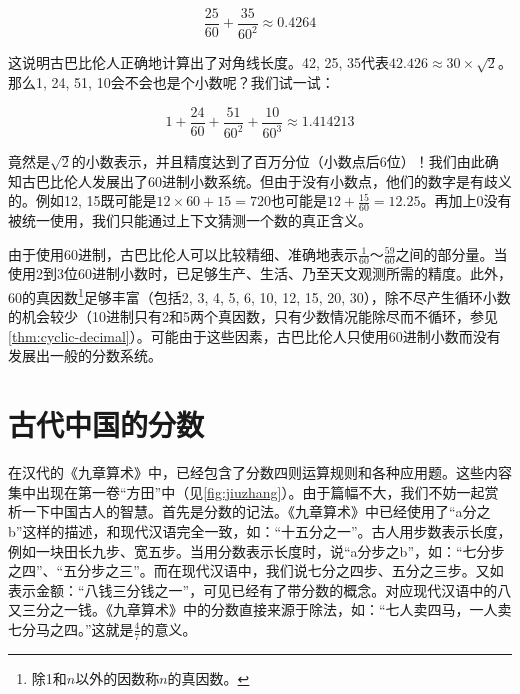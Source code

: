 \documentclass[b5paper]{ctexart}
\begin{document}
\[
\frac{25}{60} + \frac{35}{60^2} \approx 0.4264
\]

这说明古巴比伦人正确地计算出了对角线长度。42, 25, 35代表$42.426 \approx 30 \times \sqrt{2}$。那么1, 24, 51, 10会不会也是个小数呢？我们试一试：

\[
1 + \frac{24}{60} + \frac{51}{60^2} + \frac{10}{60^3} \approx 1.414213
\]

竟然是$\sqrt{2}$的小数表示，并且精度达到了百万分位（小数点后6位）！我们由此确知古巴比伦人发展出了60进制小数系统。但由于没有小数点，他们的数字是有歧义的。例如12, 15既可能是$12 \times 60 + 15 = 720$也可能是$12 + \frac{15}{60} = 12.25$。再加上0没有被统一使用，我们只能通过上下文猜测一个数的真正含义。

由于使用60进制，古巴比伦人可以比较精细、准确地表示$\frac{1}{60}$～$\frac{59}{60}$之间的部分量。当使用2到3位60进制小数时，已足够生产、生活、乃至天文观测所需的精度。此外，60的真因数\footnote{除1和$n$以外的因数称$n$的真因数。}足够丰富（包括2, 3, 4, 5, 6, 10, 12, 15, 20, 30），除不尽产生循环小数的机会较少（10进制只有2和5两个真因数，只有少数情况能除尽而不循环，参见\cref{thm:cyclic-decimal}）。可能由于这些因素，古巴比伦人只使用60进制小数而没有发展出一般的分数系统。

\section{古代中国的分数}
\label{sec:chinese-fractions}

在汉代的《九章算术》中，已经包含了分数四则运算规则和各种应用题。这些内容集中出现在第一卷“方田”中（见\cref{fig:jiuzhang}）。由于篇幅不大，我们不妨一起赏析一下中国古人的智慧。首先是分数的记法。《九章算术》中已经使用了“a分之b”这样的描述，和现代汉语完全一致，如：“十五分之一”。古人用步数表示长度，例如一块田长九步、宽五步。当用分数表示长度时，说“a分步之b”，如：“七分步之四”、“五分步之三”。而在现代汉语中，我们说七分之四步、五分之三步。又如表示金额：“八钱三分钱之一”，可见已经有了带分数的概念。对应现代汉语中的八又三分之一钱。《九章算术》中的分数直接来源于除法，如：“七人卖四马，一人卖七分马之四。”这就是$\frac{4}{7}$的意义。
\end{document}
